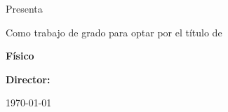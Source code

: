 \AddToShipoutPicture*{\BackgroundPic}
\thispagestyle{empty}
\begin{center}
  \vspace*{1cm}
  {\Huge \textbf{\thetitle} \par}
  \vspace{2cm}
{Presenta 
\large \par \textbf{\theauthor} \par}
  \vspace*{2cm}
 {Como trabajo de grado para optar por el título de \par \textbf{Físico} \par
 \vspace{1cm}
 \large \textbf{Director:} \par \tutor \par}
  \vspace{2cm}
  {\Large \universidad \par}
  \vspace{0.5cm}
  {\large \facultad \par}
  \vspace{0.5cm}
  {\large \lugar \par}
  \vspace{0.5cm}
  {\large \today}
  \vfill
\end{center}

\newpage


\newpage







\newpage
\tableofcontents*
\newpage
\listoftables 
\newpage
\listoffigures
\newpage

\newpage




















\backmatter 
\printbibliography

\newpage
\printindex
